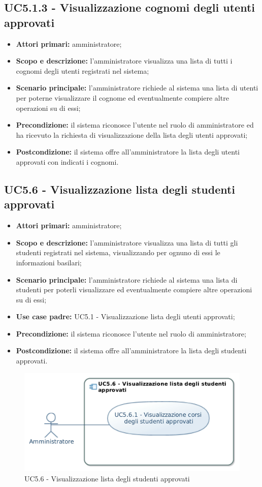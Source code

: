 \documentclass[AnalisiDeiRequisiti.tex]{subfiles}
\begin{document}
\subsection{UC5.1.3 - Visualizzazione cognomi degli utenti approvati}
\begin{itemize}
	\item \textbf{Attori primari:} amministratore;
	\item \textbf{Scopo e descrizione:} l'amministratore visualizza una lista di tutti i cognomi degli utenti registrati nel sistema;
	\item \textbf{Scenario principale:} l'amministratore richiede al sistema una lista di utenti per poterne visualizzare il cognome ed eventualmente compiere altre operazioni su di essi;
	\item \textbf{Precondizione:} il sistema riconosce l'utente nel ruolo di amministratore ed ha ricevuto la richiesta di visualizzazione della lista degli utenti approvati;
	\item \textbf{Postcondizione:} il sistema offre all'amministratore la lista degli utenti approvati con indicati i cognomi.
\end{itemize}
\subsection{UC5.6 - Visualizzazione lista degli studenti approvati}
\begin{itemize}
	\item \textbf{Attori primari:} amministratore;
	\item \textbf{Scopo e descrizione:} l'amministratore visualizza una lista di tutti gli studenti registrati nel sistema, visualizzando per ognuno di essi le informazioni basilari;
	\item \textbf{Scenario principale:} l'amministratore richiede al sistema una lista di studenti per poterli visualizzare ed eventualmente compiere altre operazioni su di essi;
	\item \textbf{Use case padre:} UC5.1 - Visualizzazione lista degli utenti approvati;
	\item \textbf{Precondizione:} il sistema riconosce l'utente nel ruolo di amministratore; 
	\item \textbf{Postcondizione:} il sistema offre all'amministratore la lista degli studenti approvati.
\end{itemize}
\begin{figure}[H]
	\centering
	\includegraphics[width=0.9\linewidth]{UC5_6.jpg}
	\caption{UC5.6 - Visualizzazione lista degli studenti approvati}
	\label{fig:UC5.6 - Visualizzazione lista degli studenti approvati}
\end{figure}
\end{document}
